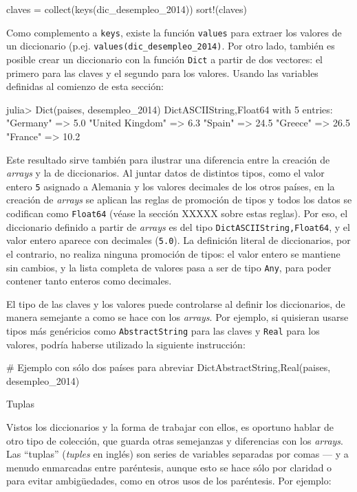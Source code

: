 ﻿\documentclass{article}
\newcommand{\code}{\texttt}
\begin{document}
{claves = collect(keys(dic_desempleo_2014))
sort!(claves)

Como complemento a \code{keys}, existe la función \code{values} para extraer los valores de un diccionario (p.ej. \code{values(dic_desempleo_2014)}. Por otro lado, también es posible crear un diccionario con la función \code{Dict} a partir de dos vectores: el primero para las claves y el segundo para los valores. Usando las variables definidas al comienzo de esta sección:

julia> Dict(paises, desempleo_2014)
Dict{ASCIIString,Float64} with 5 entries:
  "Germany"        => 5.0
  "United Kingdom" => 6.3
  "Spain"          => 24.5
  "Greece"         => 26.5
  "France"         => 10.2

Este resultado sirve también para ilustrar una diferencia entre la creación de \emph{arrays} y la de diccionarios. Al juntar datos de distintos tipos, como el valor entero \code{5} asignado a Alemania y los valores decimales de los otros países, en la creación de \emph{arrays} se aplican las reglas de promoción de tipos y todos los datos se codifican como \code{Float64} (véase la sección XXXXX sobre estas reglas). Por eso, el diccionario definido a partir de \emph{arrays} es del tipo \code{Dict{ASCIIString,Float64}}, y el valor entero aparece con decimales (\code{5.0}). La definición literal de diccionarios, por el contrario, no realiza ninguna promoción de tipos: el valor entero se mantiene sin cambios, y la lista completa de valores pasa a ser de tipo \code{Any}, para poder contener tanto enteros como decimales.

El tipo de las claves y los valores puede controlarse al definir los diccionarios, de manera semejante a como se hace con los \emph{arrays}. Por ejemplo, si quisieran usarse tipos más genéricios como \code{AbstractString} para las claves y \code{Real} para los valores, podría haberse utilizado la siguiente instrucción:

# Ejemplo con sólo dos países para abreviar
Dict{AbstractString,Real}(paises, desempleo_2014)



Tuplas

Vistos los diccionarios y la forma de trabajar con ellos, es oportuno hablar de otro tipo de colección, que guarda otras semejanzas y diferencias con los \emph{arrays}. Las ``tuplas'' (\emph{tuples} en inglés) son series de variables separadas por comas --- y a menudo enmarcadas entre paréntesis, aunque esto se hace sólo por claridad o para evitar ambigüedades, como en otros usos de los paréntesis. Por ejemplo:

}
\end{document}
